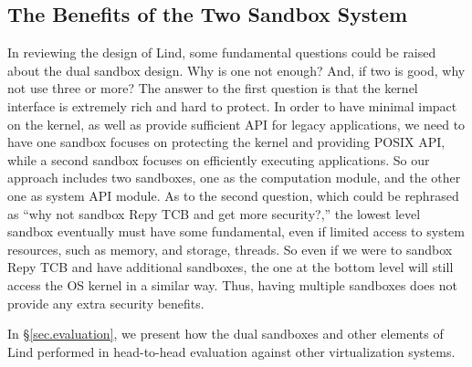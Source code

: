 \subsection{The Benefits of the Two Sandbox System}

In reviewing the design of Lind, some fundamental questions could be raised about the dual sandbox design. 
Why is one not enough? And, if two is good, why not use three or more? 
The answer to the first question is that the kernel interface is extremely rich and hard to protect. 
In order to have minimal impact on the kernel, as well as provide sufficient API for legacy applications, 
we need to have one sandbox focuses on protecting the kernel and providing POSIX API, 
while a second sandbox focuses on efficiently executing applications. 
So our approach includes two sandboxes, one as the computation module, 
and the other one as system API module. As to the second question, 
which could be rephrased as ``why not sandbox Repy TCB and get more security?,'' 
the lowest level sandbox eventually must have some fundamental, 
even if  limited access to system resources, such as memory, and storage, threads. 
So even if we were to sandbox Repy TCB and have additional sandboxes, 
the one at the bottom level will still access the OS kernel in a similar way. 
Thus, having multiple sandboxes does not provide any extra security benefits. 

In \S{\ref{sec.evaluation}}, we present how the dual sandboxes and other elements of Lind performed in 
head-to-head evaluation against other virtualization systems.
